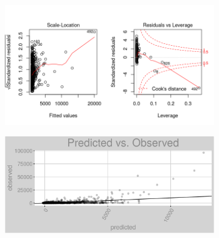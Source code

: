 \begin{figure}[h]
\centering
\begin{subfigure}{1\textwidth}
\centering
\includegraphics[width=.99\textwidth, height=0.475\textheight]{Images/fuel_oil_nn_res_2.png}
\end{subfigure}
\begin{subfigure}{1\textwidth}
\centering
\includegraphics[width=.99\textwidth, height=0.3\textheight]{Images/fuel_oil_nn_pvo.png}
\end{subfigure}
\end{figure}
\FloatBarrier
\newpage
